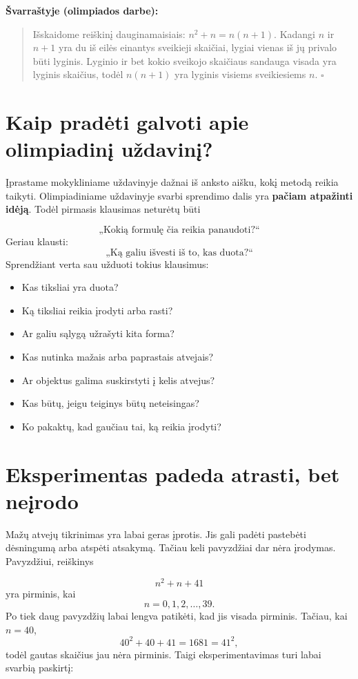 \documentclass[11pt,a4paper]{scrartcl}
\begin{document}
\noindent
\textbf{Švarraštyje (olimpiados darbe):}
\begin{quote}
Išskaidome reiškinį dauginamaisiais: $n^2+n = n(n+1)$. 
Kadangi $n$ ir $n+1$ yra du iš eilės einantys sveikieji skaičiai, lygiai vienas iš jų privalo būti lyginis. Lyginio ir bet kokio sveikojo skaičiaus sandauga visada yra lyginis skaičius, todėl $n(n+1)$ yra lyginis visiems sveikiesiems $n$. $\square$
\end{quote}

\section{Kaip pradėti galvoti apie olimpiadinį uždavinį?}

Įprastame mokykliniame uždavinyje dažnai iš anksto aišku, kokį metodą
reikia taikyti. Olimpiadiniame uždavinyje svarbi sprendimo dalis yra
\textbf{pačiam atpažinti idėją}. Todėl pirmasis klausimas neturėtų būti

\[
\text{„Kokią formulę čia reikia panaudoti?“}
\]
Geriau klausti:
\[
\text{„Ką galiu išvesti iš to, kas duota?“}
\]
Sprendžiant verta sau užduoti tokius klausimus:

\begin{itemize}
    \item Kas tiksliai yra duota?
    \item Ką tiksliai reikia įrodyti arba rasti?
    \item Ar galiu sąlygą užrašyti kita forma?
    \item Kas nutinka mažais arba paprastais atvejais?
    \item Ar objektus galima suskirstyti į kelis atvejus?
    \item Kas būtų, jeigu teiginys būtų neteisingas?
    \item Ko pakaktų, kad gaučiau tai, ką reikia įrodyti?
\end{itemize}

\section{Eksperimentas padeda atrasti, bet neįrodo}

Mažų atvejų tikrinimas yra labai geras įprotis. Jis gali padėti pastebėti
dėsningumą arba atspėti atsakymą. Tačiau keli pavyzdžiai dar nėra įrodymas. Pavyzdžiui, reiškinys

\[
n^2+n+41
\]
yra pirminis, kai
\[
n=0,1,2,\ldots,39.
\]
Po tiek daug pavyzdžių labai lengva patikėti, kad jis visada pirminis.
Tačiau, kai $n=40$,
\[
40^2+40+41=1681=41^2,
\]
todėl gautas skaičius jau nėra pirminis. Taigi eksperimentavimas turi labai svarbią paskirtį:
\end{document}
